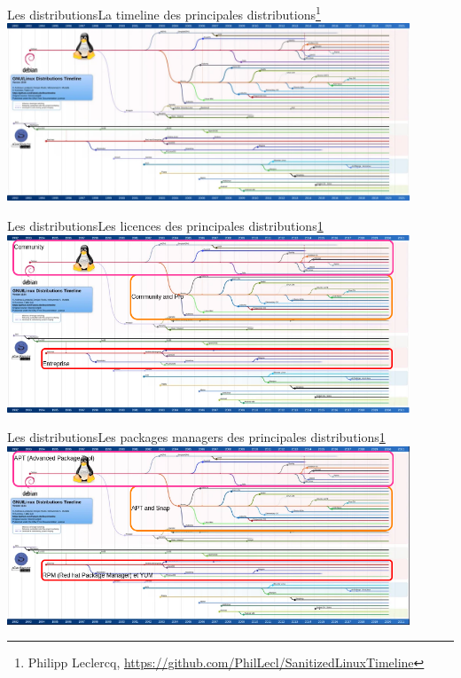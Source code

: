 \documentclass{beamer}
\begin{document}
    \begin{frame}{Les distributions}{La timeline des principales distributions\footnote{\label{main-distribution}Philipp Leclercq, \url{https://github.com/PhilLecl/SanitizedLinuxTimeline}}}
        \centering
        \includegraphics[width=12cm]{image/linux-main-distro-timeline}
    \end{frame}

    \begin{frame}{Les distributions}{Les licences des principales distributions\cref{main-distribution}}
        \centering
        \includegraphics[width=12cm]{image/main-distro-license.drawio}
    \end{frame}

    \begin{frame}{Les distributions}{Les packages managers des principales distributions\cref{main-distribution}}
        \centering
        \includegraphics[width=12cm]{image/main-distro-package-manager.drawio}
    \end{frame}
\end{document}
